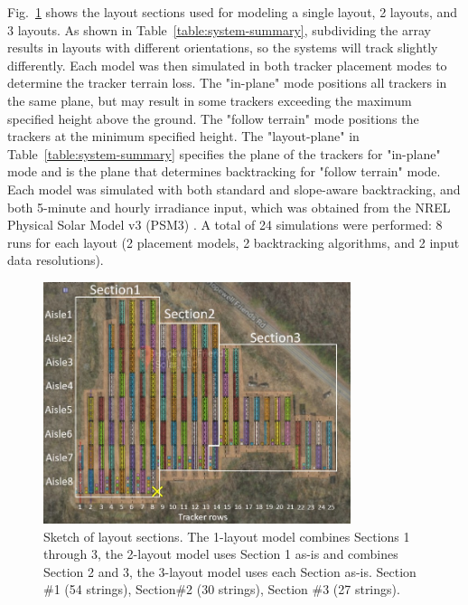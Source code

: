 \documentclass[conference]{IEEEtran}
\begin{document}
Fig.~\ref{fig:layouts} shows the layout sections used for modeling a single layout, 2 layouts, and 3 layouts. As shown in Table~\ref{table:system-summary}, subdividing the array results in layouts with different orientations, so the systems will track slightly differently. Each model was then simulated in both tracker placement modes to determine the tracker terrain loss. The "in-plane" mode positions all trackers in the same plane, but may result in some trackers exceeding the maximum specified height above the ground. The "follow terrain" mode positions the trackers at the minimum specified height. The "layout-plane" in Table~\ref{table:system-summary} specifies the plane of the trackers for "in-plane" mode and is the plane that determines backtracking for "follow terrain" mode. Each model was simulated with both standard \cite{Marion2013} and slope-aware \cite{Anderson2020} backtracking, and both 5-minute and hourly irradiance input, which was obtained from the NREL Physical Solar Model v3 (PSM3) \cite{Sengupta2018}. A total of 24 simulations were performed: 8 runs for each layout (2 placement models, 2 backtracking algorithms, and 2 input data resolutions).

\begin{figure}[htbp]
\centerline{\includegraphics[width=9cm]{layouts.jpg}}
\caption{Sketch of layout sections. The 1-layout model combines Sections 1 through 3, the 2-layout model uses Section 1 as-is and combines Section 2 and 3, the 3-layout model uses each Section as-is. Section \#1 (54 strings), Section\#2 (30 strings), Section \#3 (27 strings).}
\label{fig:layouts}
\end{figure}
\end{document}
